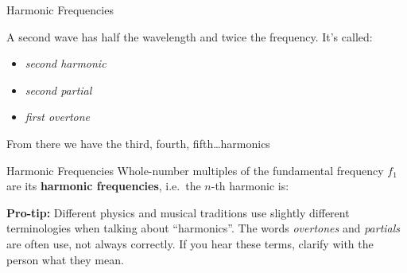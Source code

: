 \documentclass[12pt,compress,aspectratio=169]{beamer}
\newcommand{\eq}[2]{\vspace{#1}{\Large\begin{displaymath}#2\end{displaymath}}}
\begin{document}
\begin{frame}{Harmonic Frequencies}
  \begin{center}
    \vspace{-.3in}
    \hspace{.15in}
    \hspace{.15in}
  \end{center}
  A second wave has half the wavelength and twice the frequency. It's called:
  \begin{itemize}
  \item\emph{second harmonic}
  \item\emph{second partial}
  \item\emph{first overtone}
  \end{itemize}
  From there we have the third, fourth, fifth\ldots harmonics
\end{frame}



\begin{frame}{Harmonic Frequencies}
  Whole-number multiples of the fundamental frequency $f_1$ are its
  \textbf{harmonic frequencies}, i.e.\ the $n$-th harmonic is:

  \eq{-.2in}{
    \boxed{f_{h,n}=nf_1}\quad\quad n\geq 1
  }
  
  \textbf{Pro-tip:} Different physics and musical traditions use slightly
  different terminologies when talking about ``harmonics''. The words
  \emph{overtones} and \emph{partials} are often use, not always correctly. If
  you hear these terms, clarify with the person what they mean.
\end{frame}
\end{document}
